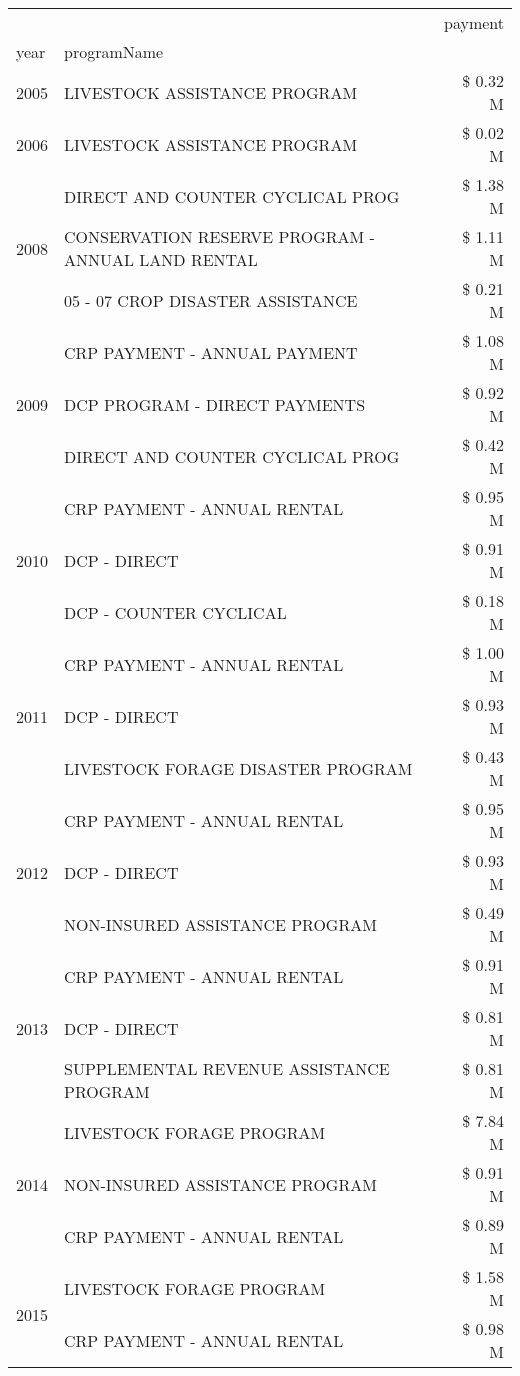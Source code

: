 \begin{tabular}{llr}
\toprule
 &  & payment \\
year & programName &  \\
\midrule
2005 & LIVESTOCK ASSISTANCE PROGRAM & \$ 0.32 M \\
\cline{1-3}
2006 & LIVESTOCK ASSISTANCE PROGRAM & \$ 0.02 M \\
\cline{1-3}
\multirow[t]{3}{*}{2008} & DIRECT AND COUNTER CYCLICAL PROG & \$ 1.38 M \\
 & CONSERVATION RESERVE PROGRAM - ANNUAL LAND RENTAL & \$ 1.11 M \\
 & 05 - 07 CROP DISASTER ASSISTANCE & \$ 0.21 M \\
\cline{1-3}
\multirow[t]{3}{*}{2009} & CRP PAYMENT - ANNUAL PAYMENT & \$ 1.08 M \\
 & DCP PROGRAM - DIRECT PAYMENTS & \$ 0.92 M \\
 & DIRECT AND COUNTER CYCLICAL PROG & \$ 0.42 M \\
\cline{1-3}
\multirow[t]{3}{*}{2010} & CRP PAYMENT - ANNUAL RENTAL & \$ 0.95 M \\
 & DCP - DIRECT & \$ 0.91 M \\
 & DCP - COUNTER CYCLICAL & \$ 0.18 M \\
\cline{1-3}
\multirow[t]{3}{*}{2011} & CRP PAYMENT - ANNUAL RENTAL & \$ 1.00 M \\
 & DCP - DIRECT & \$ 0.93 M \\
 & LIVESTOCK FORAGE DISASTER PROGRAM & \$ 0.43 M \\
\cline{1-3}
\multirow[t]{3}{*}{2012} & CRP PAYMENT - ANNUAL RENTAL & \$ 0.95 M \\
 & DCP - DIRECT & \$ 0.93 M \\
 & NON-INSURED ASSISTANCE PROGRAM & \$ 0.49 M \\
\cline{1-3}
\multirow[t]{3}{*}{2013} & CRP PAYMENT - ANNUAL RENTAL & \$ 0.91 M \\
 & DCP - DIRECT & \$ 0.81 M \\
 & SUPPLEMENTAL REVENUE ASSISTANCE PROGRAM & \$ 0.81 M \\
\cline{1-3}
\multirow[t]{3}{*}{2014} & LIVESTOCK FORAGE PROGRAM & \$ 7.84 M \\
 & NON-INSURED ASSISTANCE PROGRAM & \$ 0.91 M \\
 & CRP PAYMENT - ANNUAL RENTAL & \$ 0.89 M \\
\cline{1-3}
\multirow[t]{3}{*}{2015} & LIVESTOCK FORAGE PROGRAM & \$ 1.58 M \\
 & CRP PAYMENT - ANNUAL RENTAL & \$ 0.98 M \\

\end{tabular}
